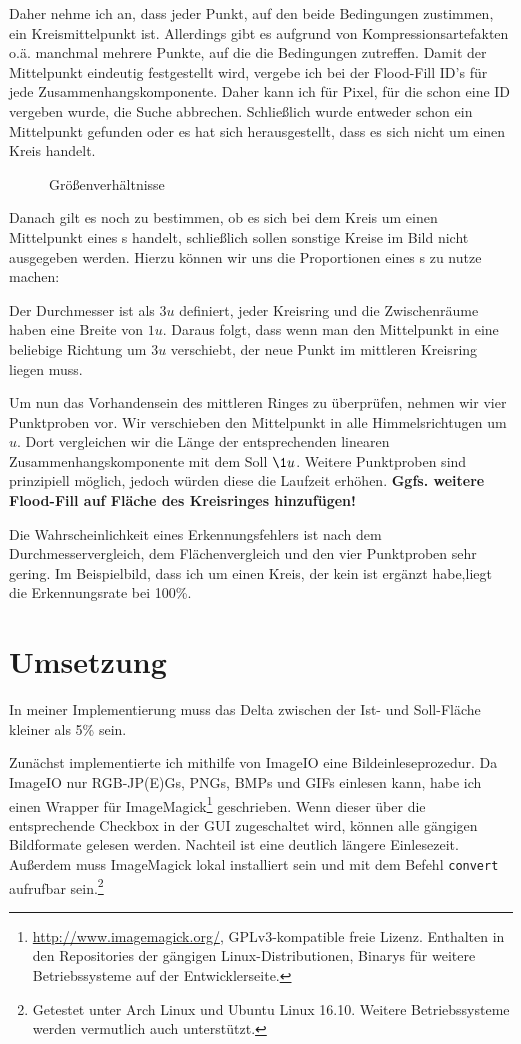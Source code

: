 Daher nehme ich an, dass jeder Punkt, auf den beide Bedingungen zustimmen, ein Kreismittelpunkt ist. Allerdings gibt es aufgrund von Kompressionsartefakten o.ä. manchmal mehrere Punkte, auf die die Bedingungen zutreffen. Damit der Mittelpunkt eindeutig festgestellt wird, vergebe ich bei der Flood-Fill ID's für jede Zusammenhangskomponente. Daher kann ich für Pixel, für die schon eine ID vergeben wurde, die Suche abbrechen. Schließlich wurde entweder schon ein Mittelpunkt gefunden oder es hat sich herausgestellt, dass es sich nicht um einen Kreis handelt.

\begin{figure}
  \centering
  
  \caption{Größenverhältnisse}
\end{figure}
Danach gilt es noch zu bestimmen, ob es sich bei dem Kreis um einen Mittelpunkt eines \task{}s handelt, schließlich sollen sonstige Kreise im Bild nicht ausgegeben werden. Hierzu können wir uns die Proportionen eines \task{}s zu nutze machen:

Der Durchmesser ist als \(3u\) definiert, jeder Kreisring und die Zwischenräume haben eine Breite von \(1u\). Daraus folgt, dass wenn man den Mittelpunkt in eine beliebige Richtung um \(3u\) verschiebt, der neue Punkt im mittleren Kreisring liegen muss.

Um nun das Vorhandensein des mittleren Ringes zu überprüfen, nehmen wir vier Punktproben vor. Wir verschieben den Mittelpunkt in alle Himmelsrichtugen um \(u\). Dort vergleichen wir die Länge der entsprechenden linearen Zusammenhangskomponente mit dem Soll \(\1u\). Weitere Punktproben sind prinzipiell möglich, jedoch würden diese die Laufzeit erhöhen. \textbf{Ggfs. weitere Flood-Fill auf Fläche des Kreisringes hinzufügen!}

Die Wahrscheinlichkeit eines Erkennungsfehlers ist nach dem Durchmesservergleich, dem Flächenvergleich und den vier Punktproben sehr gering. Im Beispielbild, dass ich um einen Kreis, der kein \task ist ergänzt habe,liegt die Erkennungsrate bei 100\%.

\pagebreak
\section{Umsetzung}
In meiner Implementierung muss das Delta zwischen der Ist- und Soll-Fläche kleiner als 5\% sein.

Zunächst implementierte ich mithilfe von ImageIO eine Bildeinleseprozedur. Da ImageIO nur RGB-JP(E)Gs, PNGs, BMPs und GIFs einlesen kann, habe ich einen Wrapper für ImageMagick\footnote{\url{http://www.imagemagick.org/}, GPLv3-kompatible freie Lizenz. Enthalten in den Repositories der gängigen Linux-Distributionen, Binarys für weitere Betriebssysteme auf der Entwicklerseite.} geschrieben. Wenn dieser über die entsprechende Checkbox in der GUI zugeschaltet wird, können alle gängigen Bildformate gelesen werden. Nachteil ist eine deutlich längere Einlesezeit. Außerdem muss ImageMagick lokal installiert sein und mit dem Befehl \texttt{convert} aufrufbar sein.\footnote{Getestet unter Arch Linux und Ubuntu Linux 16.10. Weitere Betriebssysteme werden vermutlich auch unterstützt.}

